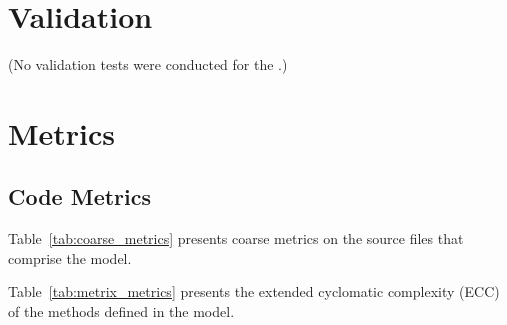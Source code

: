 \section{Validation}
(No validation tests were conducted for the \MessageHandlerDesc .)

\section{Metrics}
\subsection{Code Metrics}
Table~\ref{tab:coarse_metrics} presents coarse metrics on the source
files that comprise the model.



Table~\ref{tab:metrix_metrics} presents the extended cyclomatic complexity
(ECC) of the methods defined in the model.


